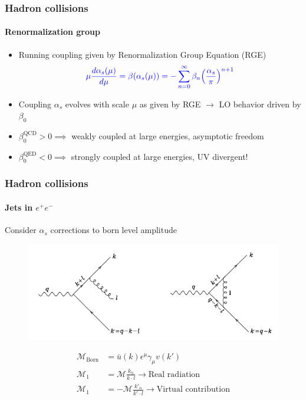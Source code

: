 \documentclass[aspectratio=43]{beamer}
\begin{document}
\begin{frame}

	\frametitle{Hadron collisions}
	\framesubtitle{Renormalization group}
	
	\begin{itemize}
		\item Running coupling given by Renormalization Group Equation (RGE)
		\begin{equation}
		{\color{blue}\mu\frac{d\alpha_{s}(\mu)}{d\mu} = \beta(\alpha_{s}(\mu)) = -\sum_{n = 0}^{\infty} \beta_{n} \Big( \frac{\alpha_{s}}{\pi} \Big)^{n + 1}} \nonumber
		\end{equation}
		\item Coupling {\color{blue}$\alpha_{s}$} evolves with scale {\color{blue}$\mu$} as given by RGE $\rightarrow$ LO behavior driven by $\beta_{0}$
		\item $\beta_{0}^{\textrm{QCD}} > 0 \implies$ weakly coupled at large energies, asymptotic freedom
		\item $\beta_{0}^{\textrm{QED}} < 0 \implies$ strongly coupled at large energies, UV divergent!
		
	\end{itemize}

\end{frame}

\begin{frame}
	
	\frametitle{Hadron collisions}
	\framesubtitle{Jets in $e^{+}e^{-}$}
	
	Consider $\alpha_{s}$ corrections to born level amplitude
	
	\begin{figure}
		\includegraphics[width = 7 cm]{plots/qcd_corrections_2.png}
	\end{figure}

	\begin{align}
		\mathcal{M}_{\textrm{Born}} &= \bar{u}(k)\epsilon^{\mu}\gamma_{\mu}v(k') \nonumber \\
		\mathcal{M}_{1} &= \mathcal{M} \frac{k_{\alpha}}{k \cdot l} \longrightarrow \textrm{Real radiation} \nonumber \\
		\mathcal{M}_{1} &= -\mathcal{M} \frac{k'_{\alpha}}{k' \cdot l} \longrightarrow \textrm{Virtual contribution} \nonumber		 
	\end{align}

\end{frame}
\end{document}
